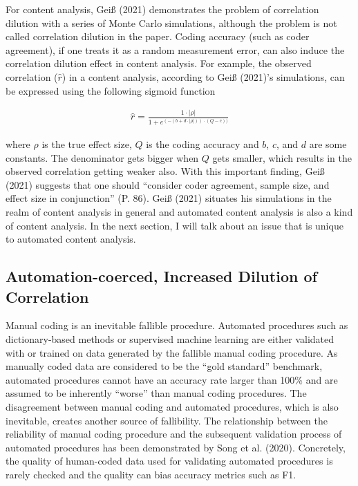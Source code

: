 \documentclass[english,man,floatsintext]{apa6}
\begin{document}
For content analysis, Geiß (2021) demonstrates the problem of correlation dilution with a series of Monte Carlo simulations, although the problem is not called correlation dilution in the paper. Coding accuracy (such as coder agreement), if one treats it as a random measurement error, can also induce the correlation dilution effect in content analysis. For example, the observed correlation (\(\hat{r}\)) in a content analysis, according to Geiß (2021)'s simulations, can be expressed using the following sigmoid function

\begin{align}
  \hat{r} = \frac{1 \cdot | \rho |}{1 + e^{(-(b+d \cdot | \rho |)) \cdot (Q - c))}}
\end{align}

where \(\rho\) is the true effect size, \(Q\) is the coding accuracy and \(b\), \(c\), and \(d\) are some constants. The denominator gets bigger when \(Q\) gets smaller, which results in the observed correlation getting weaker also. With this important finding, Geiß (2021) suggests that one should \enquote{consider coder agreement, sample size, and effect size in conjunction} (P. 86). Geiß (2021) situates his simulations in the realm of content analysis in general and automated content analysis is also a kind of content analysis. In the next section, I will talk about an issue that is unique to automated content analysis.

\hypertarget{automation-coerced-increased-dilution-of-correlation}{%
\subsection{Automation-coerced, Increased Dilution of Correlation}\label{automation-coerced-increased-dilution-of-correlation}}

Manual coding is an inevitable fallible procedure. Automated procedures such as dictionary-based methods or supervised machine learning are either validated with or trained on data generated by the fallible manual coding procedure. As manually coded data are considered to be the \enquote{gold standard} benchmark, automated procedures cannot have an accuracy rate larger than 100\% and are assumed to be inherently \enquote{worse} than manual coding procedures. The disagreement between manual coding and automated procedures, which is also inevitable, creates another source of fallibility. The relationship between the reliability of manual coding procedure and the subsequent validation process of automated procedures has been demonstrated by Song et al. (2020). Concretely, the quality of human-coded data used for validating automated procedures is rarely checked and the quality can bias accuracy metrics such as F1.
\end{document}
